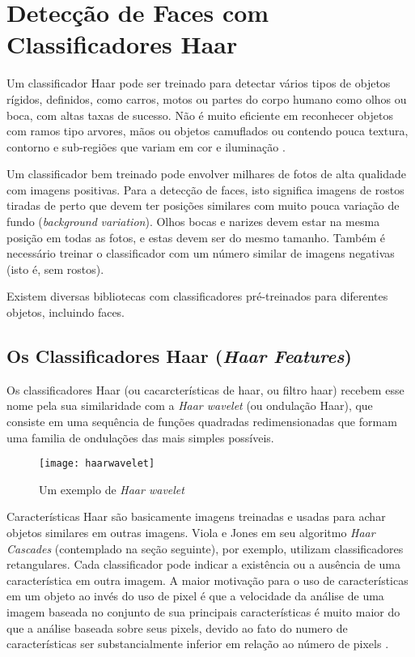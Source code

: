 \section{Detecção de Faces com Classificadores Haar}\label{sec:deteccao}

Um classificador Haar pode ser treinado para detectar vários tipos de objetos rígidos, definidos, como carros, motos ou partes do corpo humano como olhos ou boca, com altas taxas de sucesso. Não é muito eficiente em reconhecer objetos com ramos tipo arvores, mãos ou objetos camuflados ou contendo pouca textura, contorno e sub-regiões que variam em cor e iluminação \cite{drmathew_java_programming}.

Um classificador bem treinado pode envolver milhares de fotos de alta qualidade com imagens positivas. Para a detecção de faces, isto significa imagens de rostos tiradas de perto que devem ter posições similares com muito pouca variação de fundo (\textit{background} \textit{variation}). Olhos bocas e narizes devem estar na mesma posição em todas as fotos, e estas devem ser do mesmo tamanho. Também é necessário treinar o classificador com um número similar de imagens negativas (isto é, sem rostos).

Existem diversas bibliotecas com classificadores pré-treinados para diferentes objetos, incluindo faces.


\subsection{Os Classificadores Haar (\textit{Haar Features}) }\label{subsubsec:elem_haar}

Os classificadores Haar (ou cacarcterísticas de haar, ou filtro haar) recebem esse nome pela sua similaridade com a \textit{Haar wavelet} (ou ondulação Haar), que consiste em uma sequência de funções quadradas redimensionadas que formam uma familia de ondulações das mais simples possíveis.

 \begin{figure}[h]
 	\centering
 	\texttt{[image: haarwavelet]}
 	\caption{Um exemplo de \textit{Haar wavelet}}
 	\label{fig:haarwavelet}
 \end{figure}

Características Haar são basicamente imagens treinadas e usadas para achar objetos similares em outras imagens. Viola e Jones em seu algoritmo \textit{Haar Cascades} (contemplado na seção seguinte), por exemplo, utilizam classificadores retangulares. Cada classificador pode indicar a existência ou a ausência de uma característica em outra imagem. A maior motivação para o uso de características em um objeto ao invés do uso de pixel é que a velocidade da análise de uma imagem baseada no conjunto de sua principais características é muito maior do que a análise baseada sobre seus pixels, devido ao fato do numero de características ser substancialmente inferior em relação ao número de pixels \cite{gustavo_cascata}.

